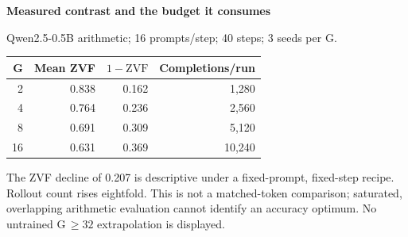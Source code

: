 \documentclass[border=8pt]{standalone}
\begin{document}
\begin{minipage}{15.2cm}\sffamily\small
{\Large\bfseries\color{ink} Measured contrast and the budget it consumes}\par\medskip
Qwen2.5-0.5B arithmetic; 16 prompts/step; 40 steps; 3 seeds per G.\par\medskip
\renewcommand{\arraystretch}{1.4}
\begin{center}\begin{tabular}{rrrr}\toprule
G & Mean ZVF & $1-\mathrm{ZVF}$ & Completions/run\\\midrule
2 & 0.838 & 0.162 & 1,280\\
4 & 0.764 & 0.236 & 2,560\\
8 & 0.691 & 0.309 & 5,120\\
16 & 0.631 & 0.369 & 10,240\\\bottomrule
\end{tabular}\end{center}\par\medskip
The ZVF decline of 0.207 is descriptive under a fixed-prompt, fixed-step recipe. Rollout count rises eightfold. This is not a matched-token comparison; saturated, overlapping arithmetic evaluation cannot identify an accuracy optimum. No untrained G\,$\ge32$ extrapolation is displayed.
\end{minipage}
\end{document}
